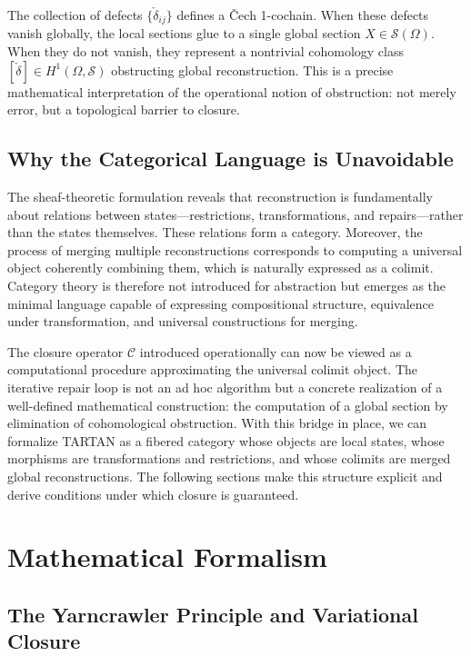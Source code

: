 \documentclass[12pt, oneside]{article}
\begin{document}
The collection of defects $\{\check{\delta}_{ij}\}$ defines a \v{C}ech 1-cochain. When these defects vanish globally, the local sections glue to a single global section $X \in \mathcal{S}(\Omega)$. When they do not vanish, they represent a nontrivial cohomology class $[\check{\delta}] \in H^1(\Omega, \mathcal{S})$ obstructing global reconstruction. This is a precise mathematical interpretation of the operational notion of obstruction: not merely error, but a topological barrier to closure.

\subsection{Why the Categorical Language is Unavoidable}

The sheaf-theoretic formulation reveals that reconstruction is fundamentally about relations between states---restrictions, transformations, and repairs---rather than the states themselves. These relations form a category. Moreover, the process of merging multiple reconstructions corresponds to computing a universal object coherently combining them, which is naturally expressed as a colimit. Category theory is therefore not introduced for abstraction but emerges as the minimal language capable of expressing compositional structure, equivalence under transformation, and universal constructions for merging.

The closure operator $\mathcal{C}$ introduced operationally can now be viewed as a computational procedure approximating the universal colimit object. The iterative repair loop is not an ad hoc algorithm but a concrete realization of a well-defined mathematical construction: the computation of a global section by elimination of cohomological obstruction. With this bridge in place, we can formalize TARTAN as a fibered category whose objects are local states, whose morphisms are transformations and restrictions, and whose colimits are merged global reconstructions. The following sections make this structure explicit and derive conditions under which closure is guaranteed.

\section{Mathematical Formalism}

\subsection{The Yarncrawler Principle and Variational Closure}
\end{document}
